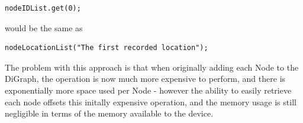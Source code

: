 \documentclass[11pt]{informatics-report}
\begin{document}
\begin{lstlisting}[frame=single]
nodeIDList.get(0);
\end{lstlisting}
would be the same as

\begin{lstlisting}[frame=single]
nodeLocationList("The first recorded location");
\end{lstlisting}

The problem with this approach is that when originally adding each Node to the DiGraph, the operation is now much more expensive to perform, and there is exponentially more space used per Node - however the ability to easily retrieve each node offsets this initally expensive operation, and the memory usage is still negligible in terms of the memory available to the device.


%
%
%
%
%
%






\appendix

%
%
\end{document}
